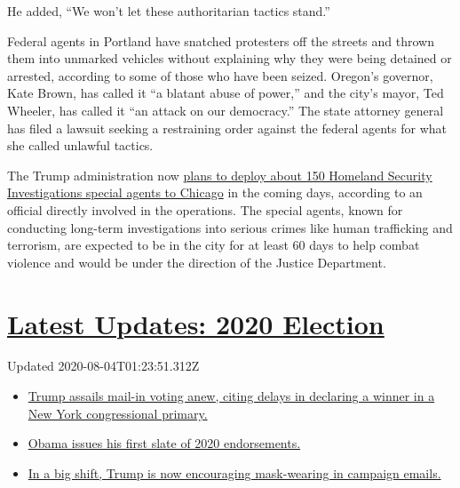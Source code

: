 He added, ``We won't let these authoritarian tactics stand.''

Federal agents in Portland have snatched protesters off the streets and
thrown them into unmarked vehicles without explaining why they were
being detained or arrested, according to some of those who have been
seized. Oregon's governor, Kate Brown, has called it ``a blatant abuse
of power,'' and the city's mayor, Ted Wheeler, has called it ``an attack
on our democracy.'' The state attorney general has filed a lawsuit
seeking a restraining order against the federal agents for what she
called unlawful tactics.

The Trump administration now
\href{https://www.chicagotribune.com/news/criminal-justice/ct-chicago-police-dhs-deployment-20200720-dftu5ychwbcxtg4ltarh5qnwma-story.html}{plans
to deploy about 150 Homeland Security Investigations special agents to
Chicago} in the coming days, according to an official directly involved
in the operations. The special agents, known for conducting long-term
investigations into serious crimes like human trafficking and terrorism,
are expected to be in the city for at least 60 days to help combat
violence and would be under the direction of the Justice Department.

\hypertarget{latest-updates-2020-election}{%
\section{\texorpdfstring{\href{https://www.nytimes3xbfgragh.onion/2020/08/03/us/elections/biden-vs-trump.html?action=click\&pgtype=Article\&state=default\&region=MAIN_CONTENT_1\&context=storylines_live_updates}{Latest
Updates: 2020
Election}}{Latest Updates: 2020 Election}}\label{latest-updates-2020-election}}

Updated 2020-08-04T01:23:51.312Z

\begin{itemize}
\tightlist
\item
  \href{https://www.nytimes3xbfgragh.onion/2020/08/03/us/elections/biden-vs-trump.html?action=click\&pgtype=Article\&state=default\&region=MAIN_CONTENT_1\&context=storylines_live_updates\#link-6494b448}{Trump
  assails mail-in voting anew, citing delays in declaring a winner in a
  New York congressional primary.}
\item
  \href{https://www.nytimes3xbfgragh.onion/2020/08/03/us/elections/biden-vs-trump.html?action=click\&pgtype=Article\&state=default\&region=MAIN_CONTENT_1\&context=storylines_live_updates\#link-3de249e6}{Obama
  issues his first slate of 2020 endorsements.}
\item
  \href{https://www.nytimes3xbfgragh.onion/2020/08/03/us/elections/biden-vs-trump.html?action=click\&pgtype=Article\&state=default\&region=MAIN_CONTENT_1\&context=storylines_live_updates\#link-54e34d20}{In
  a big shift, Trump is now encouraging mask-wearing in campaign
  emails.}
\end{itemize}

